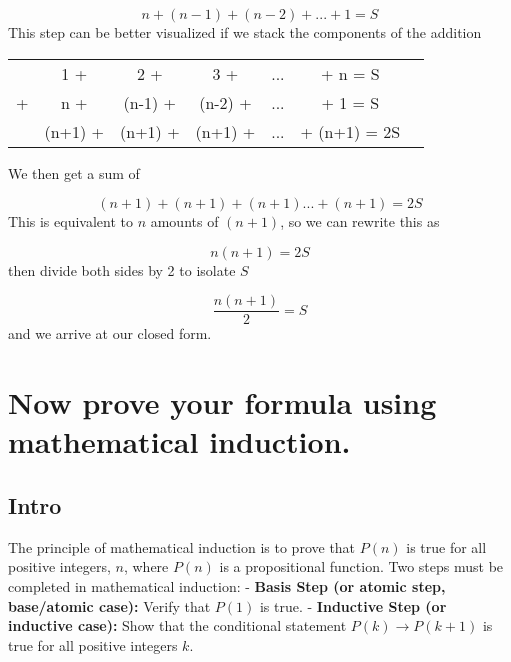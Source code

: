 \documentclass{article}
\begin{document}
\begin{equation}
n + (n-1) + (n-2) + ... + 1 = S
\end{equation}
\newline
This step can be better visualized if we stack the components of the addition
\begin{center}
\begin{tabular}{ccccccc}
  & 1 +&2 +& 3 +& ... & + n = S\\
+ & n +&(n-1) +&(n-2) +& ... & + 1 = S\\
\hline
  & (n+1) +&(n+1) +&(n+1) +& ... & + (n+1) = 2S\\
\end{tabular}
\end{center}
\newline
\newline
\newline
We then get a sum of 


\begin{equation}
(n+1) + (n+1) + (n+1) ... + (n+1) = 2S
\end{equation}
\newline
This is equivalent to $n$ amounts of $(n+1)$, so we can rewrite this as

\begin{equation}
n(n+1) = 2S
\end{equation}
\newline
then divide both sides by 2 to isolate $S$

\begin{equation}
\frac{n(n+1)}{2} = S
\end{equation}
\newline
and we arrive at our closed form.


\section{Now prove your formula using mathematical induction.}

\subsection{Intro}
The principle of mathematical induction is to prove that $P(n)$ is true for all positive integers, $n$, where $P(n)$ is a propositional function. Two steps must be completed in mathematical induction:
\newline
\newline
- \textbf{Basis Step (or atomic step, base/atomic case):} Verify that $P(1)$ is true.
\newline
\newline
- \textbf{Inductive Step (or inductive case):} Show that the conditional statement $P(k) \rightarrow P(k+1)$ is true for all positive integers $k$.
\end{document}
